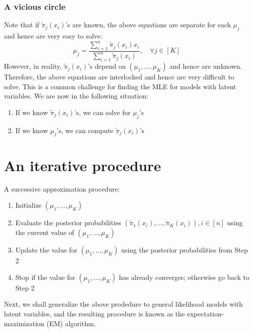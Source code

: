 \documentclass[11pt]{book}
\begin{document}
\subsubsection{A vicious circle}
Note that if $\tilde{\pi}_j(x_i)$'s are known, the above equations are separate for each 
$\mu_j$ and hence are very easy to solve: %
\[
  \mu_j = \frac{\sum_{i=1}^n \tilde{\pi}_j(x_i)x_i}{\sum_{i=1}^n \tilde{\pi}_j(x_i)}, \quad\forall j\in[K]
\]
However, in reality, $\tilde{\pi}_j(x_i)$'s depend on $(\mu_1, \dots, \mu_K)$ and hence are unknown. Therefore,
the above equations are interlocked and hence are very difficult to solve. This is a common challenge for 
finding the MLE for models with latent variables. We are now in the following situation:
\begin{enumerate}
  \item If we know $\tilde{\pi}_j(x_i)$'s, we can solve for $\mu_j$'s 
  \item If we know $\mu_j$'s, we can compute $\tilde{\pi}_j(x_i)$'s 
\end{enumerate}
\section{An iterative procedure}
A successive approximation procedure: 
\begin{enumerate}  
  \item Initialize $(\mu_1, \dots, \mu_K)$
  \item Evaluate the posterior probabilities $(\tilde{\pi}_1(x_i), \dots, \tilde{\pi}_K(x_i)), i \in [n]$ using the current value of $(\mu_1, \dots, \mu_K)$
  \item Update the value for $(\mu_1, \dots, \mu_K)$ using the posterior probabilities from Step 2 
  \item Stop if the value for $(\mu_1, \dots, \mu_K)$ has already converges; otherwise go back to Step 2 
\end{enumerate}
Next, we shall generalize the above prodedure to general likelihood models with latent variables, and the resulting procedure is known as 
the expectation-maximization (EM) algorithm. 
\end{document}
